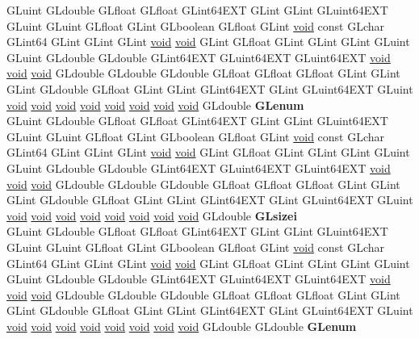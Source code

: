 \begin{DoxyCompactItemize}
\begin{tabbing}
\>GLuint GLdouble GLfloat GLfloat GLint64EXT GLint GLint GLuint64EXT GLuint GLuint GLfloat GLint GLboolean GLfloat GLint \hyperlink{interfacevoid}{void} const GLchar GLint64 GLint GLint GLint \hyperlink{interfacevoid}{void} \hyperlink{interfacevoid}{void} GLint GLfloat GLint GLint GLint GLuint GLuint GLdouble GLdouble GLint64EXT GLuint64EXT GLuint64EXT \hyperlink{interfacevoid}{void} \hyperlink{interfacevoid}{void} \hyperlink{interfacevoid}{void} GLdouble GLdouble GLdouble GLfloat GLfloat GLfloat GLint GLint GLint GLdouble GLfloat GLint GLint GLint64EXT GLint GLuint64EXT GLuint \hyperlink{interfacevoid}{void} \hyperlink{interfacevoid}{void} \hyperlink{interfacevoid}{void} \hyperlink{interfacevoid}{void} \hyperlink{interfacevoid}{void} \hyperlink{interfacevoid}{void} \hyperlink{interfacevoid}{void} \hyperlink{interfacevoid}{void} GLdouble {\bfseries GLenum}\\
\>GLuint GLdouble GLfloat GLfloat GLint64EXT GLint GLint GLuint64EXT GLuint GLuint GLfloat GLint GLboolean GLfloat GLint \hyperlink{interfacevoid}{void} const GLchar GLint64 GLint GLint GLint \hyperlink{interfacevoid}{void} \hyperlink{interfacevoid}{void} GLint GLfloat GLint GLint GLint GLuint GLuint GLdouble GLdouble GLint64EXT GLuint64EXT GLuint64EXT \hyperlink{interfacevoid}{void} \hyperlink{interfacevoid}{void} \hyperlink{interfacevoid}{void} GLdouble GLdouble GLdouble GLfloat GLfloat GLfloat GLint GLint GLint GLdouble GLfloat GLint GLint GLint64EXT GLint GLuint64EXT GLuint \hyperlink{interfacevoid}{void} \hyperlink{interfacevoid}{void} \hyperlink{interfacevoid}{void} \hyperlink{interfacevoid}{void} \hyperlink{interfacevoid}{void} \hyperlink{interfacevoid}{void} \hyperlink{interfacevoid}{void} \hyperlink{interfacevoid}{void} GLdouble {\bfseries GLsizei}\\
\>GLuint GLdouble GLfloat GLfloat GLint64EXT GLint GLint GLuint64EXT GLuint GLuint GLfloat GLint GLboolean GLfloat GLint \hyperlink{interfacevoid}{void} const GLchar GLint64 GLint GLint GLint \hyperlink{interfacevoid}{void} \hyperlink{interfacevoid}{void} GLint GLfloat GLint GLint GLint GLuint GLuint GLdouble GLdouble GLint64EXT GLuint64EXT GLuint64EXT \hyperlink{interfacevoid}{void} \hyperlink{interfacevoid}{void} \hyperlink{interfacevoid}{void} GLdouble GLdouble GLdouble GLfloat GLfloat GLfloat GLint GLint GLint GLdouble GLfloat GLint GLint GLint64EXT GLint GLuint64EXT GLuint \hyperlink{interfacevoid}{void} \hyperlink{interfacevoid}{void} \hyperlink{interfacevoid}{void} \hyperlink{interfacevoid}{void} \hyperlink{interfacevoid}{void} \hyperlink{interfacevoid}{void} \hyperlink{interfacevoid}{void} \hyperlink{interfacevoid}{void} GLdouble GLdouble {\bfseries GLenum}\\

\end{tabbing}
\end{DoxyCompactItemize}
